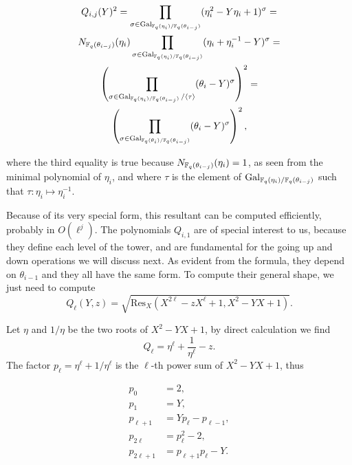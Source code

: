 \documentclass[11pt]{article}
\begin{document}
\begin{multline}
  Q_{i,j}(Y)^2 = \prod_{\sigma\in\operatorname{Gal}_{\mathbb{F}_q(\eta_i)/\mathbb{F}_q(\theta_{i-j})}}
  (\eta_i^2 - Y\eta_i + 1)^\sigma =\\
  N_{\mathbb{F}_q(\theta_{i-j})}(\eta_i) \prod_{\sigma\in\operatorname{Gal}_{\mathbb{F}_q(\eta_i)/\mathbb{F}_q(\theta_{i-j})}} 
  (\eta_i + \eta_i^{-1} - Y)^\sigma =\\
  \left(\prod_{\sigma\in\operatorname{Gal}_{\mathbb{F}_q(\eta_i)/\mathbb{F}_q(\theta_{i-j})}/\langle\tau\rangle}
    (\theta_i - Y)^\sigma\right)^2 =\\
  \left(\prod_{\sigma\in\operatorname{Gal}_{\mathbb{F}_q(\theta_i)/\mathbb{F}_q(\theta_{i-j})}}
    (\theta_i - Y)^\sigma\right)^2,
\end{multline}

where the third equality is true because
$N_{\mathbb{F}_q(\theta_{i-j})}(\eta_i)=1$, as seen from the minimal
polynomial of $\eta_i$, and where $\tau$ is the element of
$\operatorname{Gal}_{\mathbb{F}_q(\eta_i)/\mathbb{F}_q(\theta_{i-j})}$ such that
$\tau:\eta_i\mapsto\eta_i^{-1}$.

Because of its very special form, this resultant can be computed
efficiently, probably in $O(\ell^j)$. The polynomials $Q_{i,1}$
are of special interest to us, because they define each level of the
tower, and are fundamental for the going up and down operations we
will discuss next. As evident from the formula, they depend on
$\theta_{i-1}$ and they all have the same form. To compute their
general shape, we just need to compute
\begin{equation}
  Q_\ell(Y, z) = \sqrt{\mathrm{Res}_X(X^{2\ell}-zX^\ell+1, X^2-YX+1)}.
\end{equation}

Let $\eta$ and $1/\eta$ be the two roots of $X^2-YX+1$, by direct
calculation we find
\begin{equation}
  \label{eq:1}
  Q_\ell = \eta^\ell + \frac{1}{\eta^\ell} - z.
\end{equation}
The factor $p_\ell=\eta^\ell + 1/\eta^\ell$ is the $\ell$-th power sum
of $X^2-YX+1$, thus

\begin{align}
  p_0 &= 2,\\
  p_1 &= Y,\\
  \label{eq:simple}
  p_{\ell+1} &= Yp_{\ell} - p_{\ell-1},\\
  \label{eq:double}
  p_{2\ell} &= p_{\ell}^2 - 2,\\
  \label{eq:add}
  p_{2\ell+1} &= p_{\ell+1}p_\ell - Y.
\end{align}
\end{document}
